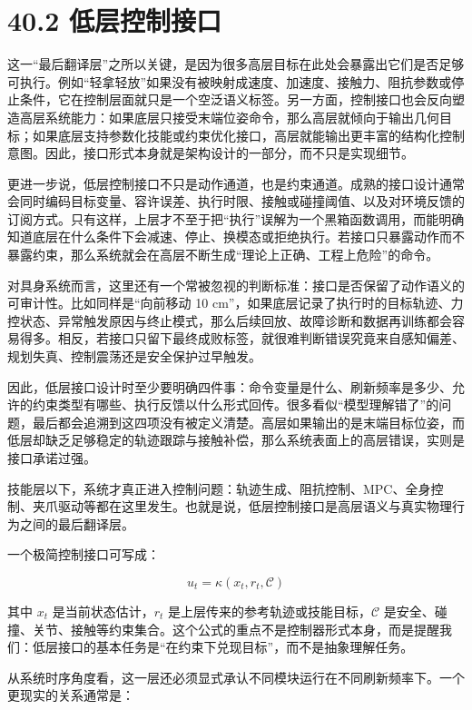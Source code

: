\section*{40.2 低层控制接口}


这一“最后翻译层”之所以关键，是因为很多高层目标在此处会暴露出它们是否足够可执行。例如“轻拿轻放”如果没有被映射成速度、加速度、接触力、阻抗参数或停止条件，它在控制层面就只是一个空泛语义标签。另一方面，控制接口也会反向塑造高层系统能力：如果底层只接受末端位姿命令，那么高层就倾向于输出几何目标；如果底层支持参数化技能或约束优化接口，高层就能输出更丰富的结构化控制意图。因此，接口形式本身就是架构设计的一部分，而不只是实现细节。

更进一步说，低层控制接口不只是动作通道，也是约束通道。成熟的接口设计通常会同时编码目标变量、容许误差、执行时限、接触或碰撞阈值、以及对环境反馈的订阅方式。只有这样，上层才不至于把“执行”误解为一个黑箱函数调用，而能明确知道底层在什么条件下会减速、停止、换模态或拒绝执行。若接口只暴露动作而不暴露约束，那么系统就会在高层不断生成“理论上正确、工程上危险”的命令。

对具身系统而言，这里还有一个常被忽视的判断标准：接口是否保留了动作语义的可审计性。比如同样是“向前移动 10 cm”，如果底层记录了执行时的目标轨迹、力控状态、异常触发原因与终止模式，那么后续回放、故障诊断和数据再训练都会容易得多。相反，若接口只留下最终成败标签，就很难判断错误究竟来自感知偏差、规划失真、控制震荡还是安全保护过早触发。

因此，低层接口设计时至少要明确四件事：命令变量是什么、刷新频率是多少、允许的约束类型有哪些、执行反馈以什么形式回传。很多看似“模型理解错了”的问题，最后都会追溯到这四项没有被定义清楚。高层如果输出的是末端目标位姿，而低层却缺乏足够稳定的轨迹跟踪与接触补偿，那么系统表面上的高层错误，实则是接口承诺过强。

技能层以下，系统才真正进入控制问题：轨迹生成、阻抗控制、MPC、全身控制、夹爪驱动等都在这里发生。也就是说，低层控制接口是高层语义与真实物理行为之间的最后翻译层。

一个极简控制接口可写成：

\begin{equation*}
u_t = \kappa(x_t, r_t, \mathcal{C})
\end{equation*}

其中 \(x_t\) 是当前状态估计，\(r_t\) 是上层传来的参考轨迹或技能目标，\(\mathcal{C}\) 是安全、碰撞、关节、接触等约束集合。这个公式的重点不是控制器形式本身，而是提醒我们：低层接口的基本任务是“在约束下兑现目标”，而不是抽象理解任务。

从系统时序角度看，这一层还必须显式承认不同模块运行在不同刷新频率下。一个更现实的关系通常是：

